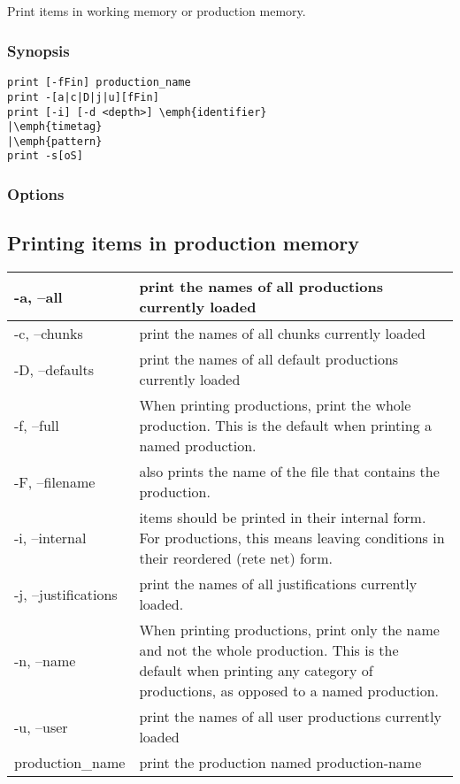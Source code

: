 \subsection{}
\label{print}
Print items in working memory or production memory. 
\subsubsection*{Synopsis}
\begin{verbatim}
print [-fFin] production_name
print -[a|c|D|j|u][fFin]
print [-i] [-d <depth>] \emph{identifier}
|\emph{timetag}
|\emph{pattern}
print -s[oS]
\end{verbatim}
\subsubsection*{Options}
\subsection*{Printing items in production memory}
\begin{tabular}{|l|l|}
\hline 
 -a, --all  & print the names of all productions currently loaded  \\
 \hline 
 -c, --chunks  & print the names of all chunks currently loaded  \\
 \hline 
 -D, --defaults  & print the names of all default productions currently loaded  \\
 \hline 
 -f, --full  & When printing productions, print the whole production. This is the default when printing a named production.  \\
 \hline 
 -F, --filename  & also prints the name of the file that contains the production.  \\
 \hline 
 -i, --internal  & items should be printed in their internal form. For productions, this means leaving conditions in their reordered (rete net) form.  \\
 \hline 
 -j, --justifications  & print the names of all justifications currently loaded.  \\
 \hline 
 -n, --name  & When printing productions, print only the name and not the whole production. This is the default when printing any category of productions, as opposed to a named production.  \\
 \hline 
 -u, --user  & print the names of all user productions currently loaded  \\
 \hline 
production\_name & print the production named production-name \\
 \hline 
\end{tabular}
